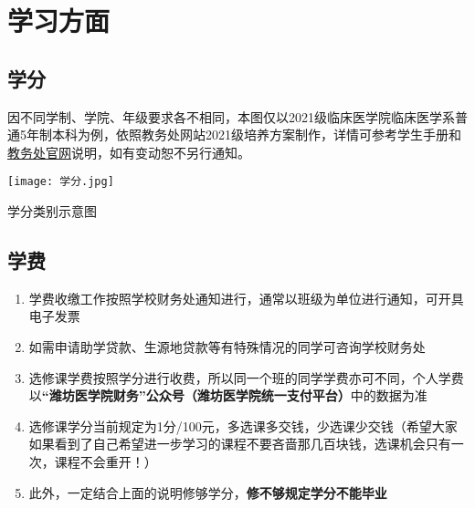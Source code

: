 \chapter[学习方面]{学习方面}
\section[学分]{学分}
因不同学制、学院、年级要求各不相同，本图仅以2021级临床医学院临床医学系普通5年制本科为例，依照教务处网站2021级培养方案制作，详情可参考学生手册和\href{https://jwch.wfmc.edu.cn/2022/0916/c5343a107934/page.htm}{\uline{教务处官网}}说明，如有变动恕不另行通知。
\begin{table}[ht]
    \centering
    \texttt{[image: 学分.jpg]}
    \caption[学分类别示意图]{学分类别示意图}
\end{table}

\section[学费]{学费}
\begin{enumerate}
    \item 学费收缴工作按照学校财务处通知进行，通常以班级为单位进行通知，可开具电子发票
    \item 如需申请助学贷款、生源地贷款等有特殊情况的同学可咨询学校财务处
    \item 选修课学费按照学分进行收费，所以同一个班的同学学费亦可不同，个人学费以\textbf{“潍坊医学院财务”公众号（潍坊医学院统一支付平台）}中的数据为准
    \item 选修课学分当前规定为1分/100元，多选课多交钱，少选课少交钱（希望大家如果看到了自己希望进一步学习的课程不要吝啬那几百块钱，选课机会只有一次，课程不会重开！）
    \item 此外，一定结合上面的说明修够学分，\textbf{修不够规定学分不能毕业}
\end{enumerate}